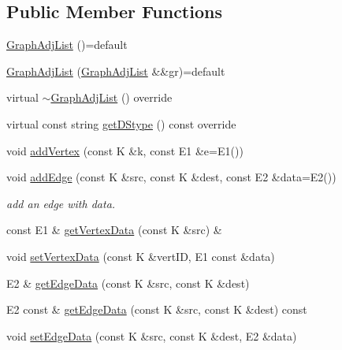 \subsection*{Public Member Functions}
\begin{DoxyCompactItemize}
\item 
\hyperlink{classbridges_1_1datastructure_1_1_graph_adj_list_adb181bcfe104b8df8b3218ccf1b67ea5}{Graph\+Adj\+List} ()=default
\item 
\hyperlink{classbridges_1_1datastructure_1_1_graph_adj_list_ac175167a4447f3fc9c7f3e72f2f6a0b1}{Graph\+Adj\+List} (\hyperlink{classbridges_1_1datastructure_1_1_graph_adj_list}{Graph\+Adj\+List} \&\&gr)=default
\item 
virtual \hyperlink{classbridges_1_1datastructure_1_1_graph_adj_list_a17413dc27d7e60e1aa31cafa32082d12}{$\sim$\+Graph\+Adj\+List} () override
\item 
virtual const string \hyperlink{classbridges_1_1datastructure_1_1_graph_adj_list_adf1bfde5ec7192f3ee334695059f8fa6}{get\+D\+Stype} () const override
\item 
void \hyperlink{classbridges_1_1datastructure_1_1_graph_adj_list_a3bde76e49be4330da895103475f8430b}{add\+Vertex} (const K \&k, const E1 \&e=E1())
\item 
void \hyperlink{classbridges_1_1datastructure_1_1_graph_adj_list_a6573cc104657315196404bcef481d890}{add\+Edge} (const K \&src, const K \&dest, const E2 \&data=E2())
\begin{DoxyCompactList}\small\item\em add an edge with data. \end{DoxyCompactList}\item 
const E1 \& \hyperlink{classbridges_1_1datastructure_1_1_graph_adj_list_a3a9d3875e7f6eb0d4c3500c53957b9c1}{get\+Vertex\+Data} (const K \&src) \&
\item 
void \hyperlink{classbridges_1_1datastructure_1_1_graph_adj_list_ab87a30e6cbaf1d2db95dce705ebdd20f}{set\+Vertex\+Data} (const K \&vert\+ID, E1 const \&data)
\item 
E2 \& \hyperlink{classbridges_1_1datastructure_1_1_graph_adj_list_ab56ec428deb9a5bc4499f42bbd710b1a}{get\+Edge\+Data} (const K \&src, const K \&dest)
\item 
E2 const  \& \hyperlink{classbridges_1_1datastructure_1_1_graph_adj_list_a5c2cdffda7c983c3141ae36acc2b698d}{get\+Edge\+Data} (const K \&src, const K \&dest) const
\item 
void \hyperlink{classbridges_1_1datastructure_1_1_graph_adj_list_a21a7e957d60e18b540dc778b1d569372}{set\+Edge\+Data} (const K \&src, const K \&dest, E2 \&data)

\end{DoxyCompactItemize}
